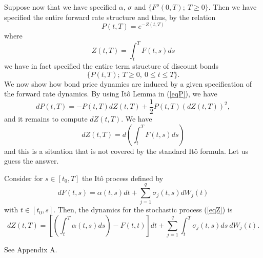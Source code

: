 Suppose now that we have specified $\alpha$, $\sigma$ and $\{
F^o(0,T);~T\geq 0\}$. Then we have specified the entire forward rate
structure and thus, by the relation  
\begin{equation}
\label{eqP}
P(t,T)=e^{-Z(t,T)}
\end{equation}
where
\begin{equation}
\label{eqZ}
Z(t,T)=\int_t^T F(t,s) ds
\end{equation}
we have in fact specified the entire term structure of discount bonds
$$
\{P(t,T);~T\geq 0,~0\leq t\leq T\}.
$$ 
We now show how bond price dynamics are induced by a given
specification of the forward rate dynamics. By using It\^o Lemma in 
(\ref{eqP}), we have  
\begin{equation}
\label{eqdP:1}
dP(t,T)=-P(t,T) dZ(t,T)+\frac{1}{2} P(t,T) \left( dZ(t,T)\right)^2,
\end{equation}
and it remains to compute $dZ(t,T)$. We have
$$
dZ(t,T)=d \left( \int_t^T F(t,s) ds\right)
$$
and this is a situation that is not covered by the standard It\^o
formula. Let us guess the answer.
\begin{propos}
Consider for $s \in [t_0, T]$ the It\^o process defined by 
\begin{equation}
dF(t,s) =  \alpha(t,s) dt + \sum_{j=1}^q \sigma_j(t,s)dW_j (t) 
\end{equation}
with $ t \in [t_0,s]$. Then, the dynamics for the stochastic process
(\ref{eqZ}) is
\begin{equation}
\label{eqdZ}
dZ(t,T)=\left[\left(\int_t^T \alpha(t,s) ds\right) - F(t,t) \right] dt
+ \sum_{j=1}^q \int_t^T \sigma_j(t,s) ds~dW_j (t).
\end{equation}
\end{propos} 
\begin{demo} 
See Appendix A.
\end{demo}

